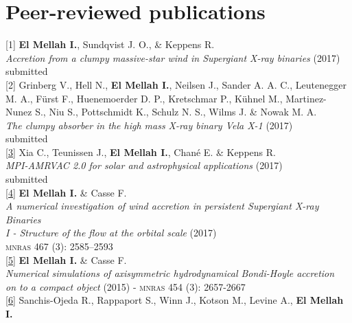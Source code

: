 \documentclass[a4paper,oneside]{article}
\begin{document}
\section*{Peer-reviewed publications}

\begin{flushleft}

[1] \textbf{El Mellah I.}, Sundqvist J. O., \& Keppens R. \\ 
\emph{Accretion from a clumpy massive-star wind in Supergiant X-ray binaries} (2017) \\
submitted\\
\vspace*{0.3cm}
[2] Grinberg V., Hell N., \textbf{El Mellah I.}, Neilsen J., Sander A. A. C., Leutenegger M. A., Fürst F., Huenemoerder D. P., Kretschmar P., Kühnel M., Martinez-Nunez S., Niu S., Pottschmidt K., Schulz N. S., Wilms J. \& Nowak M. A.\\ 
\emph{The clumpy absorber in the high mass X-ray binary Vela X-1} (2017) \\
submitted\\
\vspace*{0.3cm}
\href{https://arxiv.org/abs/1710.06140}{[3]} Xia C., Teunissen J., \textbf{El Mellah I.}, Chané E. \& Keppens R. \\ 
\emph{MPI-AMRVAC 2.0 for solar and astrophysical applications} (2017) \\
submitted\\
\vspace*{0.3cm}
\href{https://academic.oup.com/mnras/article/467/3/2585/2961795/A-numerical-investigation-of-wind-accretion-in}{[4]} \textbf{El Mellah I.} \& Casse F. \\ 
\emph{A numerical investigation of wind accretion in persistent Supergiant X-ray Binaries}\\
\emph{I - Structure of the flow at the orbital scale} (2017)\\
\textsc{mnras} 467 (3): 2585–2593\\
\vspace*{0.3cm}
\href{https://academic.oup.com/mnras/article-lookup/doi/10.1093/mnras/stv2184}{[5]} \textbf{El Mellah I.} \& Casse F. \\ 
\emph{Numerical simulations of axisymmetric hydrodynamical Bondi-Hoyle accretion}\\
\emph{on to a compact object} (2015) - \textsc{mnras} 454 (3): 2657-2667\\
\vspace*{0.3cm}
\href{http://iopscience.iop.org/article/10.1088/0004-637X/787/1/47/meta}{[6]} Sanchis-Ojeda R., Rappaport S., Winn J., Kotson M., Levine A., \textbf{El Mellah I.}\\

\end{flushleft}
\end{document}
